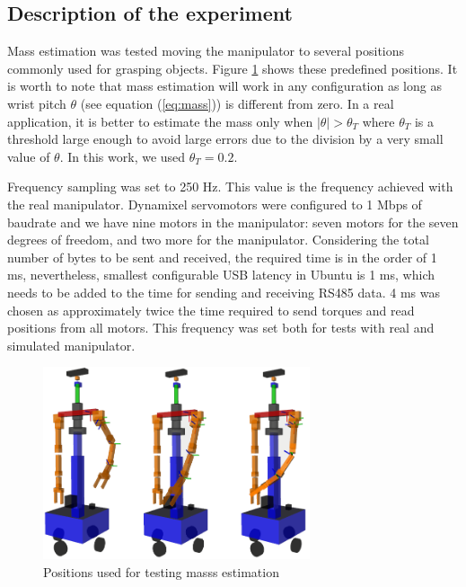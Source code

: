 \documentclass[smallextended]{svjour3}       %
\begin{document}
\subsection{Description of the experiment}
Mass estimation was tested moving the manipulator to several positions commonly used for grasping objects. Figure \ref{fig:test_poses} shows these predefined positions. It is worth to note that mass estimation will work in any configuration as long as wrist pitch $\theta$ (see equation (\ref{eq:mass})) is different from zero. In a real application, it is better to estimate the mass only when $\vert\theta\vert > \theta_T$ where $\theta_T$ is a threshold large enough to avoid large errors due to the division by a very small value of $\theta$. In this work, we used $\theta_T=0.2$. 

Frequency sampling was set to 250 Hz. This value is the frequency achieved with the real manipulator. Dynamixel servomotors were configured to 1 Mbps of baudrate and we have nine motors in the manipulator: seven motors for the seven degrees of freedom, and two more for the manipulator. Considering the total number of bytes to be sent and received, the required time is in the order of 1 ms, nevertheless, smallest configurable USB latency in Ubuntu is 1 ms, which needs to be added to the time for sending and receiving RS485 data. 4 ms was chosen as approximately twice the time required to send torques and read positions from all motors. This frequency was set both for tests with real and simulated manipulator. 

\begin{figure}[h!]
  \centering
  \includegraphics[width=0.7\textwidth]{Figures/test_poses.png}
  \caption{Positions used for testing masss estimation}
  \label{fig:test_poses}
\end{figure}
\end{document}
